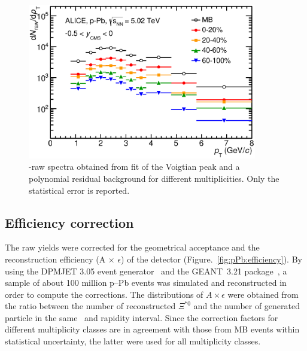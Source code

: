 \begin{figure}[htbp]
\begin{center}
\includegraphics[width=10.0cm]{./Version1/FigChapter5/Extraction/RawYield.eps}
\caption{\xis-raw spectra obtained from fit of the Voigtian peak and a polynomial residual background for different multiplicities. Only the statistical error is reported.} 
 \label{fig:pPb:rawyield}
\end{center}
\end{figure}


\newpage
\subsection{Efficiency correction}\label{sec:pPb:MC} 
The raw yields were corrected for the geometrical acceptance and the reconstruction efficiency
(A $\times$ $\epsilon$) of the detector (Figure.~\ref{fig:pPb:efficiency}). By using the DPMJET 3.05 event generator~\cite{cite:DPMJET} and the GEANT~3.21 package~\cite{cite:GEANT}, a sample of about 100 million p--Pb events was simulated and reconstructed in order to compute the corrections. The distributions of $A\times\epsilon$ were obtained from the ratio between the number of reconstructed $\Xi^{*0}$ and the number of generated particle in the same \pt~and rapidity interval. Since the correction factors for different multiplicity classes are in agreement with those from MB events within statistical uncertainty, the latter were used for all multiplicity classes.

